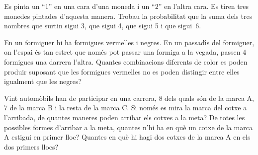 \begin{probres}
{Es pinta un ``1'' en una cara d'una moneda i un ``2'' en l'altra
cara. Es tiren tres monedes pintades d'aquesta manera. Trobau la probabilitat
que la suma dels tres nombres que surtin sigui 3, que sigui 4, que sigui
5 i que sigui~6.}
\end{probres}


\begin{probres}
{En un formiguer hi ha formigues vermelles i negres. En un
passad\'{\i}s del formiguer, on l'espai \'es tan estret que nom\'es pot passar
una formiga a la vegada, passen 4 formigues una darrera l'altra. Quantes
combinacions diferents de color es poden produir suposant que les formigues
vermelles no es poden distingir entre elles igualment que les negres?}
\end{probres}


\begin{probres}
{Vint autom\`obils han de participar en una carrera, 8 dels quals s\'on
de la marca A, 7 de la marca B i la resta de la marca C. Si nom\'es es mira la
marca del cotxe a l'arribada, de quantes maneres poden arribar els cotxes
a la meta? De totes les possibles formes d'arribar a la meta, quantes
n'hi ha en qu\`e un cotxe de la marca A estigui en primer lloc? Quantes en qu\`e
hi hagi dos cotxes de la marca A en els dos primers llocs?}
\end{probres}

